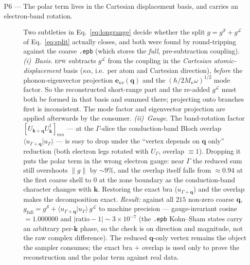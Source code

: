 \documentclass[11pt]{article}
\newcommand{\kv}{\mathbf{k}}
\newcommand{\qv}{\mathbf{q}}
\newcommand{\gshort}{g^{\mathcal{S}}}
\newcommand{\glong}{g^{\mathcal{L}}}
\begin{document}
\begin{description}
  \item[P6 --- The polar term lives in the Cartesian displacement basis, and carries an
    electron-band rotation.]
    Two subtleties in Eq.~\eqref{eq:longrange} decide whether the split
    $g=\gshort+\glong$ of Eq.~\eqref{eq:split} actually closes, and both were found by
    round-tripping against the coarse \texttt{.epb} (which stores the \emph{full},
    pre-subtraction coupling).
    \emph{(i)~Basis.} \textsc{epw} subtracts $\glong$ from the coupling in the
    \emph{Cartesian atomic-displacement} basis ($\kappa\alpha$, i.e.\ per atom and Cartesian
    direction), \emph{before} the phonon-eigenvector projection $\mathbf{e}_{\kappa\nu}(\qv)$
    and the $(\hbar/2M_{\kappa}\omega)^{1/2}$ mode factor. So the reconstructed short-range
    part and the re-added $\glong$ must both be formed in that basis and summed there;
    projecting onto branches first is inconsistent. The mode factor and eigenvector
    projection are applied afterwards by the consumer.
    \emph{(ii)~Gauge.} The band-rotation factor $[U_{\kv+\qv}U_{\kv}^{\dagger}]_{mn}$ --- at
    the $\Gamma$-slice the conduction-band Bloch overlap
    $\langle u_{\Gamma+\qv}|u_{\Gamma}\rangle$ --- is easy to drop under the ``vertex depends
    on $\qv$ only'' reduction (both electron legs rotated with $U_{\Gamma}$, overlap
    $\equiv1$). Dropping it puts the polar term in the wrong electron gauge: near $\Gamma$
    the reduced sum still overshoots $\lVert g\rVert$ by $\sim\!9\%$, and the overlap itself
    falls from $\approx0.94$ at the first coarse shell to $0$ at the zone boundary as the
    conduction-band character changes with $\kv$. Restoring the exact bra ($u_{\Gamma+\qv}$)
    and the overlap makes the decomposition exact.
    \emph{Result:} against all $215$ non-zero coarse $\qv$,
    $g_{\mathrm{full}}=\gshort+\langle u_{\Gamma+\qv}|u_{\Gamma}\rangle\,\glong$ to machine
    precision --- gauge-invariant cosine $=1.000000$ and $|\text{ratio}-1|\sim3\times10^{-7}$
    (the \texttt{.epb} Kohn--Sham states carry an arbitrary per-$\kv$ phase, so the check is
    on direction and magnitude, not the raw complex difference). The reduced $\qv$-only
    vertex remains the object the sampler consumes; the exact bra $+$ overlap is used only to
    prove the reconstruction and the polar term against real data.


\end{description}
\end{document}
